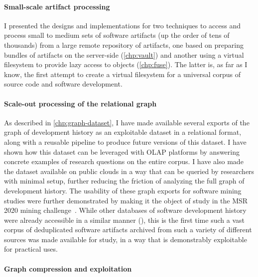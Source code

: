 \paragraph*{Small-scale artifact processing}

I presented the designs and implementations for two techniques to access and
process small to medium sets of software artifacts (up the order of tens of
thousands) from a large remote repository of artifacts, one based on preparing
bundles of artifacts on the server-side (\cref{chp:vault}) and another using a
virtual filesystem to provide lazy access to objects (\cref{chp:fuse}). The
latter is, as far as I know, the first attempt to create a virtual filesystem
for a universal corpus of source code and software development.

\paragraph*{Scale-out processing of the relational graph}

As described in \cref{chp:graph-dataset}, I have made available several exports
of the graph of development history as an exploitable dataset in a relational
format, along with a reusable pipeline to produce future versions of this
dataset. I have shown how this dataset can be leveraged with \gls{OLAP}
platforms by answering concrete examples of research questions on the entire
corpus. I have also made the dataset available on public clouds in a way that
can be queried by researchers with minimal setup, further reducing the friction
of analyzing the full graph of development history. The usability of these
graph exports for software mining studies were further demonstrated by making
it the object of study in the MSR 2020 mining
challenge~\cite{msr-2020-challenge}.
While other databases of software development history were already accessible
in a similar manner (\cite{GHTorrent,web:github-activity-data,mockus2019woc}),
this is the first time such a vast corpus of deduplicated software artifacts
archived from such a variety of different sources was made available for study,
in a way that is demonstrably exploitable for practical uses.

\paragraph*{Graph compression and exploitation}


